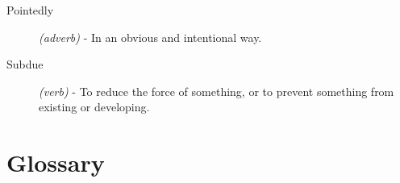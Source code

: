 \documentclass[a4paper,12pt]{article}
\begin{document}
\begin{description}
\item[Pointedly] {\it(adverb)} - In an obvious and intentional way.

\item[Subdue] {\it(verb)} - To reduce the force of something, or to prevent something from existing or developing.










\end{description}

\section{Glossary}
\end{document}
